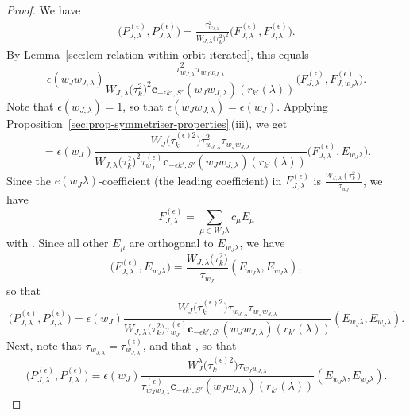 \documentclass[10pt,a4paper]{amsart}
\theoremstyle{definition}
\numberwithin{equation}{section}
\begin{document}
\begin{proof}
 We have
 \begin{align*}
 \bigl(P^{(\epsilon)}_{J,\lambda}, P^{(\epsilon)}_{J,\lambda}\bigr)
 = \frac{\tau_{w_{J,\lambda}}^2}{W_{J,\lambda}\bigl(\tau_k^2\bigr)^2}
 \bigl(F^{(\epsilon)}_{J,\lambda}, F^{(\epsilon)}_{J,\lambda}\bigr).
 \end{align*}
 By Lemma~\ref{sec:lem-relation-within-orbit-iterated}, this equals
 \[
 \epsilon(w_Jw_{J,\lambda}) \frac{\tau_{w_{J,\lambda}}^2 \tau_{w_Jw_{J,\lambda}}}{W_{J,\lambda}\bigl(\tau_k^2\bigr)^2\bm{c}_{-\epsilon k',S'}(w_Jw_{J,\lambda})(r_{k'}(\lambda))}
 \bigl(F^{(\epsilon)}_{J,\lambda}, F^{(\epsilon)}_{J,w_J\lambda}\bigr).
 \]
 Note that $\epsilon(w_{J,\lambda})=1$, so that $\epsilon(w_Jw_{J,\lambda})=\epsilon(w_J)$.
 Applying Proposition~\ref{sec:prop-symmetriser-properties}\,(iii), we get
 \[
 = \epsilon(w_J)
\frac{W_J\bigl(\tau^{(\epsilon)2}_k\bigr)\tau_{w_{J,\lambda}}^2 \tau_{w_Jw_{J,\lambda}}}{W_{J,\lambda}\bigl(\tau_k^2\bigr)^2\tau^{(\epsilon)}_{w_J}\bm{c}_{-\epsilon k',S'}(w_Jw_{J,\lambda})(r_{k'}(\lambda))}
 \bigl(F^{(\epsilon)}_{J,\lambda}, E_{w_J\lambda}\bigr).
 \]
 Since the $e(w_J\lambda)$-coefficient (the leading coefficient)
 in $F^{(\epsilon)}_{J,\lambda}$ is $\frac{W_{J,\lambda}(\tau_k^2)}{\tau_{w_J}}$,
 we have
 \[
 F^{(\epsilon)}_{J,\lambda} = \sum_{\mu\in W_J\lambda} c_\mu E_\mu
 \]
 with . Since all
 other $E_\mu$ are orthogonal to $E_{w_J\lambda}$, we have
 \[
 \bigl(F^{(\epsilon)}_{J,\lambda}, E_{w_J\lambda}\bigr)
 = \frac{W_{J,\lambda}\bigl(\tau_k^2\bigr)}{\tau_{w_J}} (E_{w_J\lambda}, E_{w_J\lambda}),
 \]
 so that
 \[
 \bigl(P^{(\epsilon)}_{J,\lambda}, P^{(\epsilon)}_{J,\lambda}\bigr)
 = \epsilon(w_J) \frac{W_J\bigl(\tau^{(\epsilon)2}_k\bigr)\tau_{w_{J,\lambda}} \tau_{w_Jw_{J,\lambda}}}{W_{J,\lambda}\bigl(\tau_k^2\bigr)\tau^{(\epsilon)}_{w_J}\bm{c}_{-\epsilon k',S'}(w_Jw_{J,\lambda})(r_{k'}(\lambda))}
 (E_{w_J\lambda}, E_{w_J\lambda}).
 \]
 Next, note that $\tau_{w_{J,\lambda}}=\tau^{(\epsilon)}_{w_{J,\lambda}}$,
 and that ,
 so that
 \[
 \bigl(P^{(\epsilon)}_{J,\lambda}, P^{(\epsilon)}_{J,\lambda}\bigr)
 = \epsilon(w_J) \frac{W_J^\lambda\bigl(\tau^{(\epsilon)2}_k\bigr)\tau_{w_J w_{J,\lambda}}}{\tau^{(\epsilon)}_{w_Jw_{J,\lambda}}
 \bm{c}_{-\epsilon k', S'}(w_Jw_{J,\lambda})(r_{k'}(\lambda))}
 (E_{w_J\lambda}, E_{w_J\lambda}).\tag*{\qed}
 \] \renewcommand{\qed}{}
\end{proof}
\end{document}
